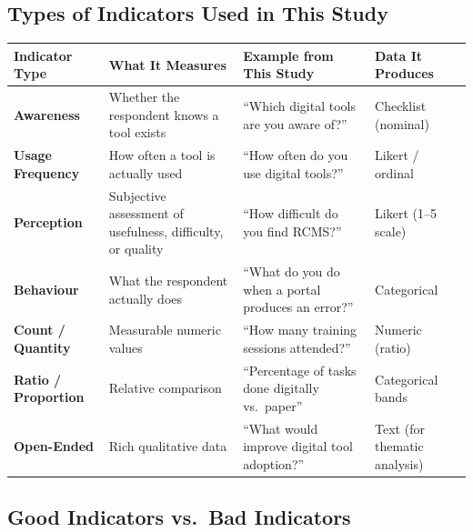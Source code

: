 \documentclass[11pt,a4paper]{article}
\begin{document}
\subsection*{Types of Indicators Used in This Study}

\begin{table}[H]\centering\small
\begin{tabularx}{\textwidth}{L{2.5cm} L{3cm} X L{3cm}}
\toprule
\textbf{Indicator Type} & \textbf{What It Measures} & \textbf{Example from This Study} & \textbf{Data It Produces} \\
\midrule
\textbf{Awareness} & Whether the respondent knows a tool exists & ``Which digital tools are you aware of?'' & Checklist (nominal) \\[4pt]
\textbf{Usage Frequency} & How often a tool is actually used & ``How often do you use digital tools?'' & Likert / ordinal \\[4pt]
\textbf{Perception} & Subjective assessment of usefulness, difficulty, or quality & ``How difficult do you find RCMS?'' & Likert (1--5 scale) \\[4pt]
\textbf{Behaviour} & What the respondent actually does & ``What do you do when a portal produces an error?'' & Categorical \\[4pt]
\textbf{Count / Quantity} & Measurable numeric values & ``How many training sessions attended?'' & Numeric (ratio) \\[4pt]
\textbf{Ratio / Proportion} & Relative comparison & ``Percentage of tasks done digitally vs.\ paper'' & Categorical bands \\[4pt]
\textbf{Open-Ended} & Rich qualitative data & ``What would improve digital tool adoption?'' & Text (for thematic analysis) \\
\bottomrule
\end{tabularx}
\end{table}

\subsection*{Good Indicators vs.\ Bad Indicators}
\end{document}

